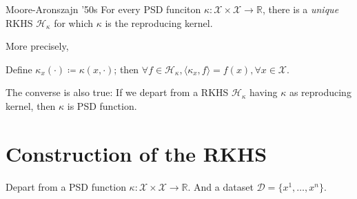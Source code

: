 \begin{theorem}[parbox=false]{Moore-Aronszajn '50s}{}
	For every PSD funciton $\kappa: \mathcal{X} \times \mathcal{X} \to \mathds{R}$, there
	is a \emph{unique} RKHS $\mathcal{H}_\kappa$ for which $\kappa$ is the reproducing kernel.

	\tcblower

	More precisely,

	Define $\kappa_x(\cdot) \coloneqq \kappa(x, \cdot)$; then
	$\forall f \in \mathcal{H}_\kappa,
		\langle \kappa_x, f \rangle = f(x), \forall x \in \mathcal{X}$.

	\begin{note}The converse is also true:
		If we depart from a RKHS $\mathcal{H}_{\kappa}$ having
		$\kappa$ as reproducing kernel, then $\kappa$ is PSD function.
	\end{note}
\end{theorem}

\pagebreak
\section{Construction of the RKHS}

Depart from a PSD function $\kappa: \mathcal{X} \times \mathcal{X} \to \mathds{R}$.
And a dataset $\mathcal{D} = \{x^1, \dots, x^n\}$.

